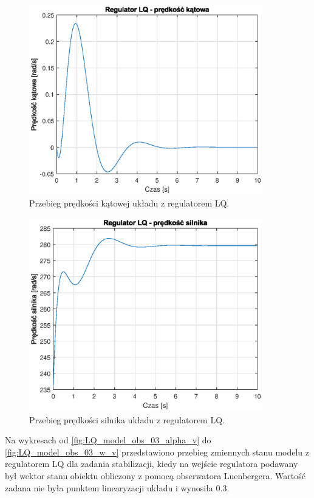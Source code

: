 \documentclass[11pt,a4paper]{article}
\begin{document}
\begin{figure}[H]
	\centering
	\includegraphics[width=4in]{Figures/LQ_model_03_dalpha_v.eps}
	\caption{Przebieg prędkości kątowej układu z regulatorem LQ.}
	\label{fig:LQ_model_03_dalpha_v}
\end{figure}

\begin{figure}[H]
	\centering
	\includegraphics[width=4in]{Figures/LQ_model_03_w_v.eps}
	\caption{Przebieg prędkości silnika układu z regulatorem LQ.}
	\label{fig:LQ_model_03_w_v}
\end{figure}

Na wykresach od \ref{fig:LQ_model_obs_03_alpha_v} do \ref{fig:LQ_model_obs_03_w_v} przedstawiono przebieg zmiennych stanu modelu z regulatorem LQ dla zadania stabilizacji, kiedy na wejście regulatora podawany był wektor stanu obiektu obliczony z pomocą obserwatora Luenbergera. Wartość zadana nie była punktem linearyzacji układu i wynosiła 0.3.
\end{document}
